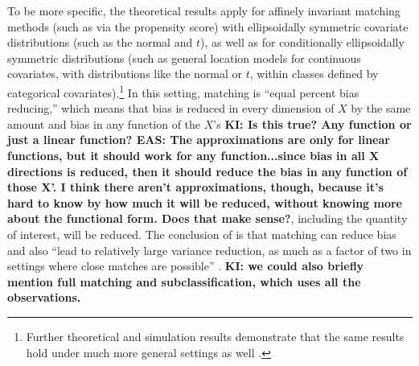 \documentclass[11pt,titlepage]{article}
\begin{document}
To be more specific, the theoretical results apply for affinely
invariant matching methods (such as via the propensity score) with
ellipsoidally symmetric covariate distributions (such as the normal
and $t$), as well as for conditionally ellipsoidally symmetric
distributions (such as general location models for continuous
covariates, with distributions like the normal or $t$, within classes
defined by categorical covariates).\footnote{Further theoretical and simulation results demonstrate
that the same results hold under much more general settings as well
\citep{RubTho96, RubStu06}.}  In this setting, matching is ``equal percent bias
reducing,'' which means that bias is reduced in every dimension of $X$
by the same amount and bias in any function of the $X$'s {\bf KI: Is
  this true? Any function or just a linear function?  EAS:  The approximations are only
for linear functions, but it should work for any function...since bias in all X directions is reduced,
then it should reduce the bias in any function of those X'.  I think there aren't approximations, though, because 
it's hard to know by how much it will be reduced, without knowing more about the functional form.  Does that make 
sense?}, including the
quantity of interest, will be reduced.  The conclusion of
\citet{RubTho92} is that matching can reduce bias and also ``lead to
relatively large variance reduction, as much as a factor of two in
settings where close matches are possible'' \citep[see
also][]{RubTho96}. {\bf KI: we could also briefly mention full
  matching and subclassification, which uses all the observations. }
\end{document}

